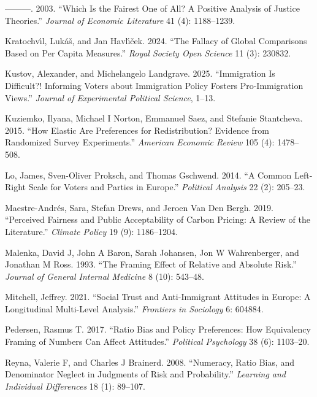 \documentclass[
  12pt,
  a4paper,
]{article}
\newlength{\cslhangindent}
\newenvironment{CSLReferences}[2] %
 {\begin{list}{}{%
  \setlength{\itemindent}{0pt}
  \setlength{\leftmargin}{0pt}
  \setlength{\parsep}{0pt}
  \ifodd #1
   \setlength{\leftmargin}{\cslhangindent}
   \setlength{\itemindent}{-1\cslhangindent}
  \fi
  \setlength{\itemsep}{#2\baselineskip}}}
 {\end{list}}
\begin{document}
\begin{CSLReferences}{1}{0}
---------. 2003. {``Which Is the Fairest One of All? A Positive Analysis of Justice Theories.''} \emph{Journal of Economic Literature} 41 (4): 1188--1239.

Kratochvı́l, Lukáš, and Jan Havlı́ček. 2024. {``The Fallacy of Global Comparisons Based on Per Capita Measures.''} \emph{Royal Society Open Science} 11 (3): 230832.

Kustov, Alexander, and Michelangelo Landgrave. 2025. {``Immigration Is Difficult?! Informing Voters about Immigration Policy Fosters Pro-Immigration Views.''} \emph{Journal of Experimental Political Science}, 1--13.

Kuziemko, Ilyana, Michael I Norton, Emmanuel Saez, and Stefanie Stantcheva. 2015. {``How Elastic Are Preferences for Redistribution? Evidence from Randomized Survey Experiments.''} \emph{American Economic Review} 105 (4): 1478--508.

Lo, James, Sven-Oliver Proksch, and Thomas Gschwend. 2014. {``A Common Left-Right Scale for Voters and Parties in Europe.''} \emph{Political Analysis} 22 (2): 205--23.

Maestre-Andrés, Sara, Stefan Drews, and Jeroen Van Den Bergh. 2019. {``Perceived Fairness and Public Acceptability of Carbon Pricing: A Review of the Literature.''} \emph{Climate Policy} 19 (9): 1186--1204.

Malenka, David J, John A Baron, Sarah Johansen, Jon W Wahrenberger, and Jonathan M Ross. 1993. {``The Framing Effect of Relative and Absolute Risk.''} \emph{Journal of General Internal Medicine} 8 (10): 543--48.

Mitchell, Jeffrey. 2021. {``Social Trust and Anti-Immigrant Attitudes in Europe: A Longitudinal Multi-Level Analysis.''} \emph{Frontiers in Sociology} 6: 604884.

Pedersen, Rasmus T. 2017. {``Ratio Bias and Policy Preferences: How Equivalency Framing of Numbers Can Affect Attitudes.''} \emph{Political Psychology} 38 (6): 1103--20.

Reyna, Valerie F, and Charles J Brainerd. 2008. {``Numeracy, Ratio Bias, and Denominator Neglect in Judgments of Risk and Probability.''} \emph{Learning and Individual Differences} 18 (1): 89--107.


\end{CSLReferences}
\end{document}
